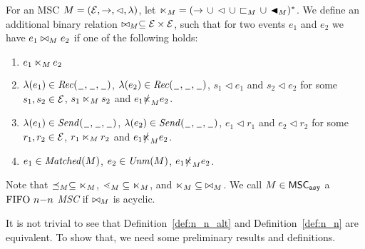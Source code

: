 \begin{definition} [$\nn$ alternative]\label{def:n_n_alt}
	For an MSC $M = (\mathcal{E},\to,\lhd,\lambda)$, let ${\ltimes}_M = ({\to} \,\cup\, {\lhd} \,\cup\, {\sqsubset_M} \,\cup\, {\blacktriangleleft_M})^\ast$. We define an additional binary relation $\bowtie_M \subseteq \mathcal{E} \times \mathcal{E}$, such that for two events $e_1$ and $e_2$ we have $e_1 \bowtie_M e_2$ if one of the following holds:
	\begin{enumerate}\itemsep=0.5ex
		\item $e_1 \ltimes_M e_2$
		\item $\lambda(e_1) \in {\mathit{Rec}(\hspace{0.1em}\underline{\hspace{0.5em}}\hspace{0.1em},\hspace{0.1em}\underline{\hspace{0.5em}}\hspace{0.1em},\hspace{0.1em}\underline{\hspace{0.5em}}\hspace{0.1em})}$, $\lambda(e_2) \in {\mathit{Rec}(\hspace{0.1em}\underline{\hspace{0.5em}}\hspace{0.1em},\hspace{0.1em}\underline{\hspace{0.5em}}\hspace{0.1em},\hspace{0.1em}\underline{\hspace{0.5em}}\hspace{0.1em})}$, $s_1 \lhd e_1$ and $s_2 \lhd e_2$ for some $s_1,s_2 \in \mathcal{E}$, $s_1 \ltimes_M s_2$ and $e_1 \slashed{\ltimes}_M e_2$.
		\item $\lambda(e_1) \in {\mathit{Send}(\hspace{0.1em}\underline{\hspace{0.5em}}\hspace{0.1em},\hspace{0.1em}\underline{\hspace{0.5em}}\hspace{0.1em},\hspace{0.1em}\underline{\hspace{0.5em}}\hspace{0.1em})}$, $\lambda(e_2) \in {\mathit{Send}(\hspace{0.1em}\underline{\hspace{0.5em}}\hspace{0.1em},\hspace{0.1em}\underline{\hspace{0.5em}}\hspace{0.1em},\hspace{0.1em}\underline{\hspace{0.5em}}\hspace{0.1em})}$, $e_1 \lhd r_1$ and $e_2 \lhd r_2$ for some $r_1,r_2 \in \mathcal{E}$, $r_1 \ltimes_M r_2$ and $e_1 \slashed{\ltimes}_M e_2$.
		\item $e_1 \in \mathit{Matched}(M)$, $e_2 \in \mathit{Unm}(M)$, $e_1 \slashed{\ltimes}_M e_2$.
	\end{enumerate}
	
	Note that $\preceq_M \subseteq \ltimes_M$, $\lessdot_M \subseteq \ltimes_M$, and $\ltimes_M \subseteq\; \bowtie_M$. We call $M \in \mathsf{MSC}_{\mathtt{asy}}$ a \emph{$\nn$ MSC}
	if ${\bowtie_M}$ is acyclic.
\end{definition}

It is not trivial to see that Definition~\ref{def:n_n_alt} and Definition~\ref{def:n_n} are equivalent. To show that, we need some preliminary results and definitions. 

